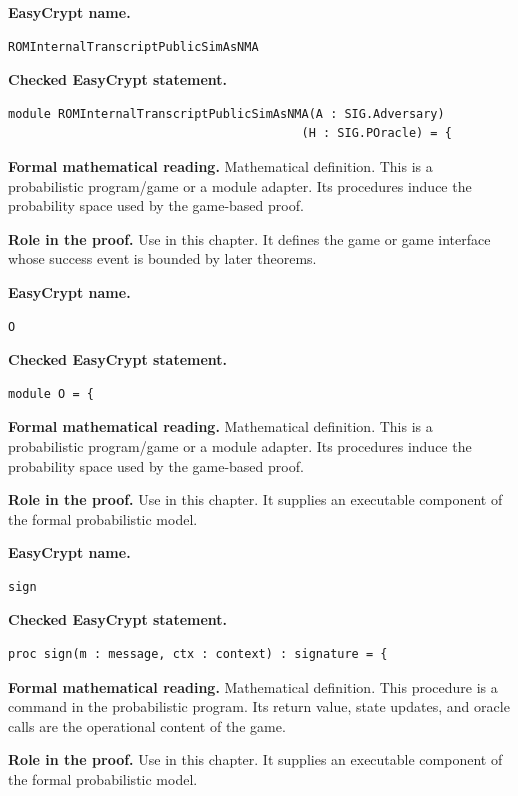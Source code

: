 \begin{formaldefinition}
\noindent\textbf{EasyCrypt name.}
\begin{lstlisting}[language=EasyCrypt,basicstyle=\ttfamily\scriptsize]
ROMInternalTranscriptPublicSimAsNMA
\end{lstlisting}
\noindent\textbf{Checked EasyCrypt statement.}
\begin{lstlisting}[language=EasyCrypt,basicstyle=\ttfamily\scriptsize]
module ROMInternalTranscriptPublicSimAsNMA(A : SIG.Adversary)
                                         (H : SIG.POracle) = {
\end{lstlisting}
\noindent\textbf{Formal mathematical reading.}
Mathematical definition. This is a probabilistic program/game or a module adapter.  Its procedures induce the probability space used by the game-based proof.

\noindent\textbf{Role in the proof.}
Use in this chapter. It defines the game or game interface whose success event is bounded by later theorems.

\end{formaldefinition}

\begin{formaldefinition}
\noindent\textbf{EasyCrypt name.}
\begin{lstlisting}[language=EasyCrypt,basicstyle=\ttfamily\scriptsize]
O
\end{lstlisting}
\noindent\textbf{Checked EasyCrypt statement.}
\begin{lstlisting}[language=EasyCrypt,basicstyle=\ttfamily\scriptsize]
module O = {
\end{lstlisting}
\noindent\textbf{Formal mathematical reading.}
Mathematical definition. This is a probabilistic program/game or a module adapter.  Its procedures induce the probability space used by the game-based proof.

\noindent\textbf{Role in the proof.}
Use in this chapter. It supplies an executable component of the formal probabilistic model.

\end{formaldefinition}

\begin{formaldefinition}
\noindent\textbf{EasyCrypt name.}
\begin{lstlisting}[language=EasyCrypt,basicstyle=\ttfamily\scriptsize]
sign
\end{lstlisting}
\noindent\textbf{Checked EasyCrypt statement.}
\begin{lstlisting}[language=EasyCrypt,basicstyle=\ttfamily\scriptsize]
proc sign(m : message, ctx : context) : signature = {
\end{lstlisting}
\noindent\textbf{Formal mathematical reading.}
Mathematical definition. This procedure is a command in the probabilistic program.  Its return value, state updates, and oracle calls are the operational content of the game.

\noindent\textbf{Role in the proof.}
Use in this chapter. It supplies an executable component of the formal probabilistic model.

\end{formaldefinition}

